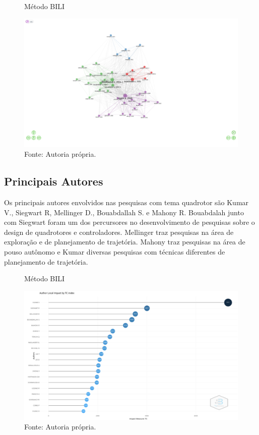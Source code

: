 \begin{figure} [h!]	
    \centering
    \caption{Método BILI}
    \includegraphics[width=1\textwidth]{Figures/network.png}
    \caption*{Fonte: Autoria própria.}
    \label{fig:QFD}
  \end{figure}

\subsection{Principais Autores}

Os principais autores envolvidos nas pesquisas com tema quadrotor são Kumar V., Siegwart R, Mellinger D., Bouabdallah S. e Mahony R. Bouabdalah junto com Siegwart foram um dos percursores no desenvolvimento de pesquisas sobre o design de quadrotores e controladores. Mellinger traz pesquisas na área de exploração e de planejamento de trajetória. Mahony traz pesquisas na área de pouso autônomo e Kumar diversas pesquisas com técnicas diferentes de planejamento de trajetória.

\begin{figure} [h!]	
    \centering
    \caption{Método BILI}
    \includegraphics[width=1\textwidth]{Figures/newplot.png}
    \caption*{Fonte: Autoria própria.}
    \label{fig:QFD}
  \end{figure}

